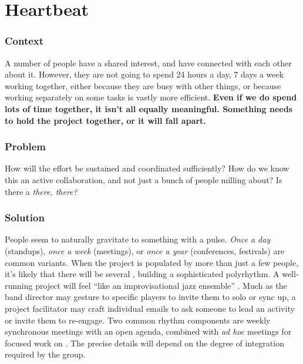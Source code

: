 \section{Heartbeat}\label{sec:Heartbeat}

\subsubsection*{Context}
A number of people have a shared interest, and have connected with each other about it.  However, they are not going to spend 24 hours a day, 7 days a week working together, either because they are busy with other things, or because working separately on some tasks is vastly more efficient.
\textbf{Even if we do spend lots of time together, it isn't all equally meaningful.  Something needs to hold the project together, or it will fall apart.}

\subsubsection*{Problem} How will the effort be sustained and coordinated sufficiently?  How do we know this an active collaboration, and not just a bunch of people milling about?  Is there a \emph{there, there?}  

\subsubsection*{Solution} People seem to naturally gravitate to something with a pulse.  \emph{Once a day} (standups), \emph{once a week} (meetings), or \emph{once a year} (conferences, festivals) are common variants.  When the project is populated by more than just a few people, it's likely that there will be several , building a sophisticated polyrhythm.  A well-running project will feel ``like an improvisational jazz ensemble'' \cite{david2001software}.  Much as the band director may gesture to specific players to invite them to solo or sync up, a project facilitator may craft individual emails to ask someone to lead an activity or invite them to re-engage.  Two common rhythm components are weekly synchronous meetings with an open agenda, combined with \emph{ad hoc} meetings for focused work on .  The precise details will depend on the degree of integration required by the group.

